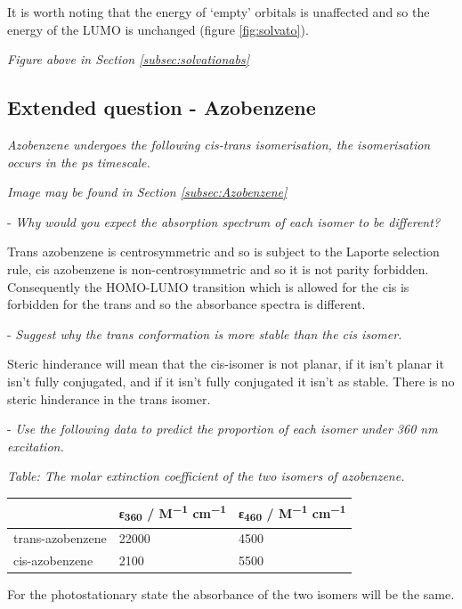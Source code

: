 \documentclass[
]{book}
\begin{document}
It is worth noting that the energy of `empty' orbitals is unaffected and so the energy of the LUMO is unchanged (figure \ref{fig:solvato}).

\emph{Figure above in Section \ref{subsec:solvationabs}}

\hypertarget{subsec:Azobenzeneans}{%
\subsection{Extended question - Azobenzene}\label{subsec:Azobenzeneans}}

\emph{Azobenzene undergoes the following cis-trans isomerisation, the isomerisation occurs in the ps timescale.}

\emph{Image may be found in Section \ref{subsec:Azobenzene}}

- \emph{Why would you expect the absorption spectrum of each isomer to be different?}

Trans azobenzene is centrosymmetric and so is subject to the Laporte selection rule, cis azobenzene is non-centrosymmetric and so it is not parity forbidden. Consequently the HOMO-LUMO transition which is allowed for the cis is forbidden for the trans and so the absorbance spectra is different.

- \emph{Suggest why the trans conformation is more stable than the cis isomer.}

Steric hinderance will mean that the cis-isomer is not planar, if it isn't planar it isn't fully conjugated, and if it isn't fully conjugated it isn't as stable. There is no steric hinderance in the trans isomer.

- \emph{Use the following data to predict the proportion of each isomer under 360 nm excitation.}

\emph{Table: \label{tab:azobenzeneabs} The molar extinction coefficient of the two isomers of azobenzene.}

\begin{longtable}[]{@{}lll@{}}
\toprule
& ε\textsubscript{360} / M\textsuperscript{−1} cm\textsuperscript{−1} & ε\textsubscript{460} / M\textsuperscript{−1} cm\textsuperscript{−1} \\
\midrule
\endhead
trans-azobenzene & 22000 & 4500 \\
cis-azobenzene & 2100 & 5500 \\
\bottomrule
\end{longtable}

For the photostationary state the absorbance of the two isomers will be the same.
\end{document}
